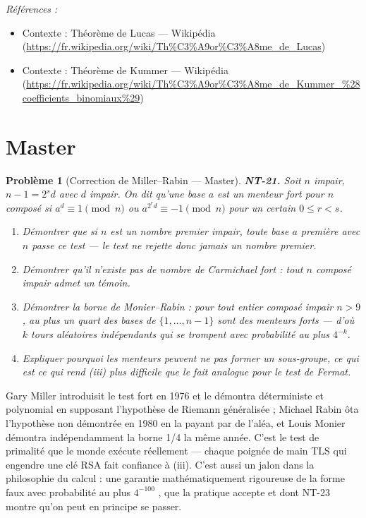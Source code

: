 \documentclass[11pt]{article}
\newtheorem{problem}{Problème}
\newenvironment{refs}{\par\small\noindent\emph{Références :}\begin{itemize}\setlength\itemsep{0pt}}{\end{itemize}\normalsize}
\begin{document}
\begin{refs}
\item Contexte : Théorème de Lucas --- Wikipédia (\url{https://fr.wikipedia.org/wiki/Th%C3%A9or%C3%A8me_de_Lucas})
\item Contexte : Théorème de Kummer --- Wikipédia (\url{https://fr.wikipedia.org/wiki/Th%C3%A9or%C3%A8me_de_Kummer_%28coefficients_binomiaux%29})
\end{refs}

\bigskip


\section*{Master}

\begin{problem}[{Correction de Miller--Rabin --- Master}]
\textbf{NT-21.} Soit $n$ impair, $n - 1 = 2^s d$ avec $d$
impair. On dit qu'une base $a$ est un \textit{menteur fort} pour $n$ composé si
$a^d \equiv 1 \pmod n$ ou $a^{2^r d} \equiv -1 \pmod n$ pour un certain
$0 \le r < s$.
\begin{enumerate}
\item[(i)] Démontrer que si $n$ est un nombre premier impair, toute base $a$ première
avec $n$ passe ce test --- le test ne rejette donc jamais un nombre premier.
\item[(ii)] Démontrer qu'il
n'existe pas de \og{} nombre de Carmichael fort \fg{} : tout $n$ composé impair admet un témoin.
\item[(iii)] Démontrer la
borne de Monier--Rabin : pour tout entier composé impair $n > 9$, au plus un quart des bases de
$\{1, \ldots, n - 1\}$ sont des menteurs forts --- d'où $k$ tours aléatoires indépendants qui se
trompent avec probabilité au plus $4^{-k}$.
\item[(iv)] Expliquer pourquoi les menteurs peuvent ne pas former un
sous-groupe, ce qui est ce qui rend (iii) plus difficile que le fait analogue pour le test de
Fermat.
\end{enumerate}

\end{problem}

\noindent Gary Miller introduisit le test fort en 1976 et le démontra
déterministe et polynomial en supposant l'hypothèse de Riemann généralisée ; Michael
Rabin ôta l'hypothèse non démontrée en 1980 en la payant par de l'aléa, et Louis
Monier démontra indépendamment la borne 1/4 la même année. C'est le test de primalité que
le monde exécute réellement --- chaque poignée de main TLS qui engendre une clé RSA fait confiance à
(iii). C'est aussi un jalon dans la philosophie du calcul : une garantie mathématiquement rigoureuse
de la forme \og{} faux avec probabilité au plus $4^{-100}$ \fg{}, que la pratique accepte
et dont NT-23 montre qu'on peut en principe se passer.
\end{document}
